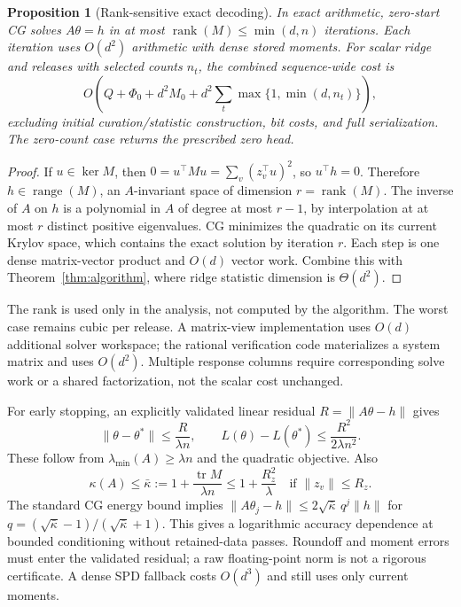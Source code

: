 \documentclass[11pt,a4paper]{article}
\newtheorem{proposition}[theorem]{Proposition}
\theoremstyle{definition}\newtheorem{definition}[theorem]{Definition}
\begin{document}
\begin{proposition}[Rank-sensitive exact decoding]\label{prop:cg}
In exact arithmetic, zero-start CG solves $A\theta=h$ in at most $\operatorname{rank}(M)\le\min(d,n)$ iterations. Each iteration uses $O(d^2)$ arithmetic with dense stored moments. For scalar ridge and releases with selected counts $n_t$, the combined sequence-wide cost is
\begin{equation}\label{eq:total-ridge}
 O\!\left(Q+\Phi_0+d^2M_0+d^2\sum_t\max\{1,\min(d,n_t)\}\right),
\end{equation}
excluding initial curation/statistic construction, bit costs, and full serialization. The zero-count case returns the prescribed zero head.
\end{proposition}
\begin{proof}
If $u\in\ker M$, then $0=u^\top Mu=\sum_v(z_v^\top u)^2$, so $u^\top h=0$. Therefore $h\in\operatorname{range}(M)$, an $A$-invariant space of dimension $r=\operatorname{rank}(M)$. The inverse of $A$ on $h$ is a polynomial in $A$ of degree at most $r-1$, by interpolation at at most $r$ distinct positive eigenvalues. CG minimizes the quadratic on its current Krylov space, which contains the exact solution by iteration $r$. Each step is one dense matrix-vector product and $O(d)$ vector work. Combine this with Theorem~\ref{thm:algorithm}, where ridge statistic dimension is $\Theta(d^2)$.
\end{proof}
The rank is used only in the analysis, not computed by the algorithm. The worst case remains cubic per release. A matrix-view implementation uses $O(d)$ additional solver workspace; the rational verification code materializes a system matrix and uses $O(d^2)$. Multiple response columns require corresponding solve work or a shared factorization, not the scalar cost unchanged.

For early stopping, an explicitly validated linear residual $R=\|A\theta-h\|$ gives
\[
 \|\theta-\theta^*\|\le\frac{R}{\lambda n},\qquad
 L(\theta)-L(\theta^*)\le\frac{R^2}{2\lambda n^2}.
\]
These follow from $\lambda_{\min}(A)\ge\lambda n$ and the quadratic objective. Also
\[
 \kappa(A)\le\bar\kappa:=1+\frac{\operatorname{tr}M}{\lambda n}
 \le1+\frac{R_z^2}{\lambda}\quad\text{if }\|z_v\|\le R_z.
\]
The standard CG energy bound implies
$\|A\theta_j-h\|\le2\sqrt{\bar\kappa}\,q^j\|h\|$ for $q=(\sqrt{\bar\kappa}-1)/(\sqrt{\bar\kappa}+1)$. This gives a logarithmic accuracy dependence at bounded conditioning without retained-data passes. Roundoff and moment errors must enter the validated residual; a raw floating-point norm is not a rigorous certificate. A dense SPD fallback costs $O(d^3)$ and still uses only current moments.
\end{document}
